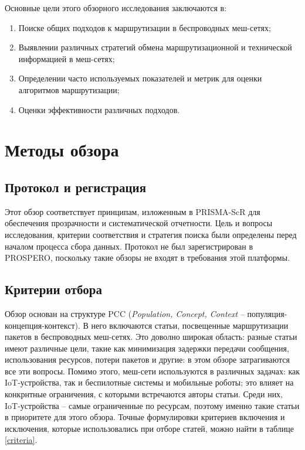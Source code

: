 \documentclass[%
]{report}
\begin{document}
Основные цели этого обзорного исследования заключаются в:

\begin{enumerate}

\item Поиске общих подходов к маршрутизации в беспроводных меш-сетях;
\item Выявлении различных стратегий обмена маршрутизационной и технической информацией в меш-сетях;
\item Определении часто используемых показателей и метрик для оценки алгоритмов маршрутизации;
\item Оценки эффективности различных подходов.
\end{enumerate}

\section{Методы обзора}\label{methods}

\subsection{Протокол и регистрация}\label{protocol-and-registration}

Этот обзор соответствует принципам, изложенным в
PRISMA-ScR для обеспечения прозрачности и
систематической отчетности.
Цель и вопросы исследования, критерии соответствия
и стратегия поиска были определены перед началом процесса сбора данных.
Протокол не был зарегистрирован в PROSPERO,
поскольку такие обзоры не входят в требования этой платформы.

\subsection{Критерии отбора}\label{eligibility-criteria}

Обзор основан на структуре PCC\cite{afc61c6cf471416489e36a4bc382d3b9}
(\emph{Population, Concept, Context} -- популяция-концепция-контекст).
В него включаются статьи, посвещенные маршрутизации пакетов в беспроводных меш-сетях.
Это доволно широкая область:
разные статьи имеют различные цели,
такие как минимизация задержки передачи сообщения,
использования ресурсов,
потери пакетов и другие: в этом обзоре затрагиваются
все эти вопросы.
Помимо этого, меш-сети используются в различных задачах:
как IoT-устройства, так и беспилотные системы
и мобильные роботы;
это влияет на конкрнтные ограничения,
с которыми встречаются авторы статьи.
Среди них, IoT-устройства -- самые ограниченные по ресурсам,
поэтому именно такие статьи в приоритете для этого обзора.
Точные формулировки критериев включения и исключения,
которые использовались при отборе статей, можно найти в таблице \ref{criteria}.
\end{document}
